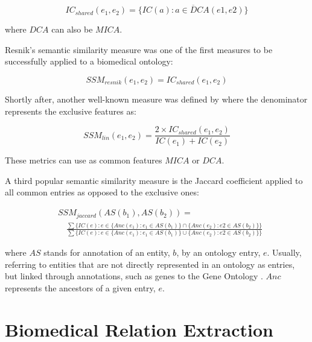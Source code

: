 \begin{equation}
    IC_{shared}(e_1, e_2) = \overline{\{IC(a):a \in DCA(e1, e2)\}}
\end{equation}

where $DCA$ can also be $MICA$. 
 
Resnik's semantic similarity measure \citep{resnik1995using} was one of the first measures to be successfully applied to a biomedical ontology:

\begin{equation}
    SSM_{resnik}(e_1, e_2) = IC_{shared}(e_1, e_2)
\end{equation}

Shortly after, another well-known measure was defined by \cite{lin1998information} where the denominator represents the exclusive features as:

\begin{equation}
    SSM_{lin}(e_1, e_2) = \frac{2 \times IC_{shared}(e_1, e_2)}{IC(e_1) + IC(e_2)}
\end{equation}

These metrics can use as common features $MICA$ or $DCA$.

A third popular semantic similarity measure is the Jaccard coefficient applied to all common entries as opposed to the exclusive ones:

\begin{equation}
\begin{aligned}
     & SSM_{jaccard}(AS(b_1),AS(b_2)) ={} \\
     & \quad \frac{\sum\{IC(e):e \in \{Anc(e_1) : e_1 \in AS(b_1)\} \cap \{Anc(e_2):e2 \in AS(b_2)\}\}}{\sum\{IC(e):e \in \{Anc(e_1) : e_1 \in AS(b_1)\} \cup \{Anc(e_2):e2 \in AS(b_2)\}\}} 
    \end{aligned}
\end{equation}

where $AS$ stands for annotation of an entity, $b$, by an ontology entry, $e$. Usually, referring to entities that are not directly represented in an ontology as entries, but linked through annotations, such as genes to the Gene Ontology \citep{ashburner2000gene}. $Anc$ represents the ancestors of a given entry, $e$.


\section{Biomedical Relation Extraction} 


